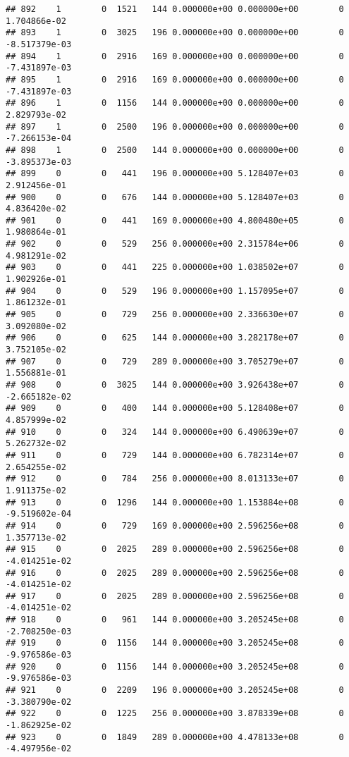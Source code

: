 \documentclass[
]{article}
\begin{document}
\begin{enumerate}
\begin{verbatim}
## 892    1        0  1521   144 0.000000e+00 0.000000e+00        0  1.704866e-02
## 893    1        0  3025   196 0.000000e+00 0.000000e+00        0 -8.517379e-03
## 894    1        0  2916   169 0.000000e+00 0.000000e+00        0 -7.431897e-03
## 895    1        0  2916   169 0.000000e+00 0.000000e+00        0 -7.431897e-03
## 896    1        0  1156   144 0.000000e+00 0.000000e+00        0  2.829793e-02
## 897    1        0  2500   196 0.000000e+00 0.000000e+00        0 -7.266153e-04
## 898    1        0  2500   144 0.000000e+00 0.000000e+00        0 -3.895373e-03
## 899    0        0   441   196 0.000000e+00 5.128407e+03        0  2.912456e-01
## 900    0        0   676   144 0.000000e+00 5.128407e+03        0  4.836420e-02
## 901    0        0   441   169 0.000000e+00 4.800480e+05        0  1.980864e-01
## 902    0        0   529   256 0.000000e+00 2.315784e+06        0  4.981291e-02
## 903    0        0   441   225 0.000000e+00 1.038502e+07        0  1.902926e-01
## 904    0        0   529   196 0.000000e+00 1.157095e+07        0  1.861232e-01
## 905    0        0   729   256 0.000000e+00 2.336630e+07        0  3.092080e-02
## 906    0        0   625   144 0.000000e+00 3.282178e+07        0  3.752105e-02
## 907    0        0   729   289 0.000000e+00 3.705279e+07        0  1.556881e-01
## 908    0        0  3025   144 0.000000e+00 3.926438e+07        0 -2.665182e-02
## 909    0        0   400   144 0.000000e+00 5.128408e+07        0  4.857999e-02
## 910    0        0   324   144 0.000000e+00 6.490639e+07        0  5.262732e-02
## 911    0        0   729   144 0.000000e+00 6.782314e+07        0  2.654255e-02
## 912    0        0   784   256 0.000000e+00 8.013133e+07        0  1.911375e-02
## 913    0        0  1296   144 0.000000e+00 1.153884e+08        0 -9.519602e-04
## 914    0        0   729   169 0.000000e+00 2.596256e+08        0  1.357713e-02
## 915    0        0  2025   289 0.000000e+00 2.596256e+08        0 -4.014251e-02
## 916    0        0  2025   289 0.000000e+00 2.596256e+08        0 -4.014251e-02
## 917    0        0  2025   289 0.000000e+00 2.596256e+08        0 -4.014251e-02
## 918    0        0   961   144 0.000000e+00 3.205245e+08        0 -2.708250e-03
## 919    0        0  1156   144 0.000000e+00 3.205245e+08        0 -9.976586e-03
## 920    0        0  1156   144 0.000000e+00 3.205245e+08        0 -9.976586e-03
## 921    0        0  2209   196 0.000000e+00 3.205245e+08        0 -3.380790e-02
## 922    0        0  1225   256 0.000000e+00 3.878339e+08        0 -1.862925e-02
## 923    0        0  1849   289 0.000000e+00 4.478133e+08        0 -4.497956e-02

\end{verbatim}
\end{enumerate}
\end{document}
